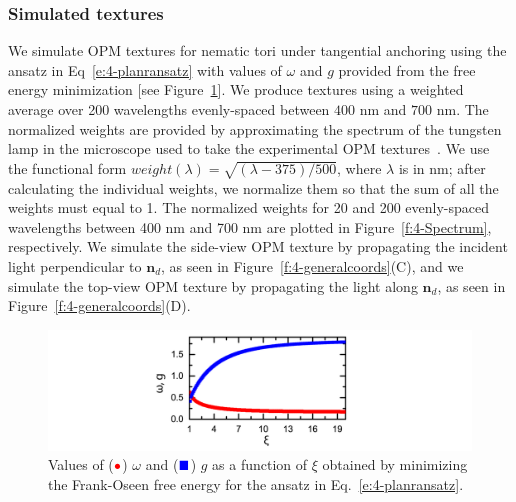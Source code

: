 \subsubsection{Simulated textures}
We simulate OPM textures for nematic tori under tangential anchoring using the ansatz in Eq~\ref{e:4-planransatz} with values of $\omega$ and $g$ provided from the free energy minimization [see Figure~\ref{f:4-OmegaG}].
We produce textures using a weighted average over 200 wavelengths evenly-spaced between $400$ nm and $700$ nm.
The normalized weights are provided by approximating the spectrum of the tungsten lamp in the microscope used to take the experimental OPM textures~\cite{RN288}.
We use the functional form $\mathit{weight}(\lambda)  = \sqrt{(\lambda-375)/500} $, where $\lambda$ is in nm; after calculating the individual weights, we normalize them so that the sum of all the weights must equal to 1.
The normalized weights for 20 and 200 evenly-spaced wavelengths between 400 nm and 700 nm are plotted in Figure~\ref{f:4-Spectrum}, respectively.
We simulate the side-view OPM texture by propagating the incident light perpendicular to $\mathbf{n}_d$, as seen in Figure~\ref{f:4-generalcoords}(C), and we simulate the top-view OPM texture by propagating the light along $\mathbf{n}_d$, as seen in Figure~\ref{f:4-generalcoords}(D).
\begin{figure}
  \includegraphics{figures/C4/Ch4-Figs_OmegaG.png}
  \caption{Values of ($\color{red} \bullet$) $\omega$ and ($\color{blue}\blacksquare$) $g$ as a function of $\xi$ obtained by minimizing the Frank-Oseen free energy for the ansatz in Eq.~\ref{e:4-planransatz}.}\label{f:4-OmegaG}
\end{figure}

